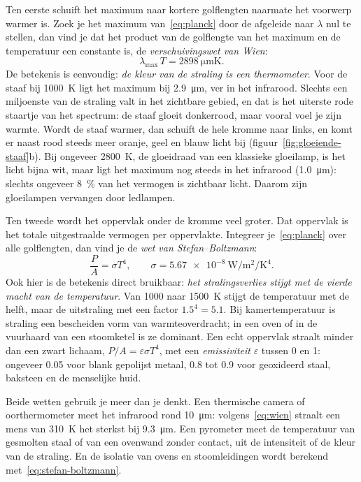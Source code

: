 Ten eerste schuift het maximum naar kortere golflengten naarmate het voorwerp warmer is. Zoek je het maximum van~\eqref{eq:planck} door de afgeleide naar $\lambda$ nul te stellen, dan vind je dat het product van de golflengte van het maximum en de temperatuur een constante is, de \emph{verschuivingswet van Wien}:
\begin{equation}
\lambda_{\max}\,T = \SI{2898}{\micro\metre\kelvin}.
\label{eq:wien}
\end{equation}
De betekenis is eenvoudig: \emph{de kleur van de straling is een thermometer}. Voor de staaf bij \SI{1000}{\kelvin} ligt het maximum bij \SI{2.9}{\micro\metre}, ver in het infrarood. Slechts een miljoenste van de straling valt in het zichtbare gebied, en dat is het uiterste rode staartje van het spectrum: de staaf gloeit donkerrood, maar vooral voel je zijn warmte. Wordt de staaf warmer, dan schuift de hele kromme naar links, en komt er naast rood steeds meer oranje, geel en blauw licht bij (figuur~\ref{fig:gloeiende-staaf}b). Bij ongeveer \SI{2800}{\kelvin}, de gloeidraad van een klassieke gloeilamp, is het licht bijna wit, maar ligt het maximum nog steeds in het infrarood (\SI{1.0}{\micro\metre}): slechts ongeveer \SI{8}{\percent} van het vermogen is zichtbaar licht. Daarom zijn gloeilampen vervangen door ledlampen.

Ten tweede wordt het oppervlak onder de kromme veel groter. Dat oppervlak is het totale uitgestraalde vermogen per oppervlakte. Integreer je~\eqref{eq:planck} over alle golflengten, dan vind je de \emph{wet van Stefan--Boltzmann}:
\begin{equation}
\frac{P}{A} = \sigma T^4, \qquad \sigma = \SI{5.67e-8}{\watt\per\metre\squared\per\kelvin\tothe{4}}.
\label{eq:stefan-boltzmann}
\end{equation}
Ook hier is de betekenis direct bruikbaar: \emph{het stralingsverlies stijgt met de vierde macht van de temperatuur}. Van \SI{1000}{} naar \SI{1500}{\kelvin} stijgt de temperatuur met de helft, maar de uitstraling met een factor $1.5^4 = 5.1$. Bij kamertemperatuur is straling een bescheiden vorm van warmteoverdracht; in een oven of in de vuurhaard van een stoomketel is ze dominant. Een echt oppervlak straalt minder dan een zwart lichaam, $P/A = \varepsilon\sigma T^4$, met een \emph{emissiviteit} $\varepsilon$ tussen 0 en 1: ongeveer 0.05 voor blank gepolijst metaal, 0.8 tot 0.9 voor geoxideerd staal, baksteen en de menselijke huid.

Beide wetten gebruik je meer dan je denkt. Een thermische camera of oorthermometer meet het infrarood rond \SI{10}{\micro\metre}: volgens~\eqref{eq:wien} straalt een mens van \SI{310}{\kelvin} het sterkst bij \SI{9.3}{\micro\metre}. Een pyrometer meet de temperatuur van gesmolten staal of van een ovenwand zonder contact, uit de intensiteit of de kleur van de straling. En de isolatie van ovens en stoomleidingen wordt berekend met~\eqref{eq:stefan-boltzmann}.

